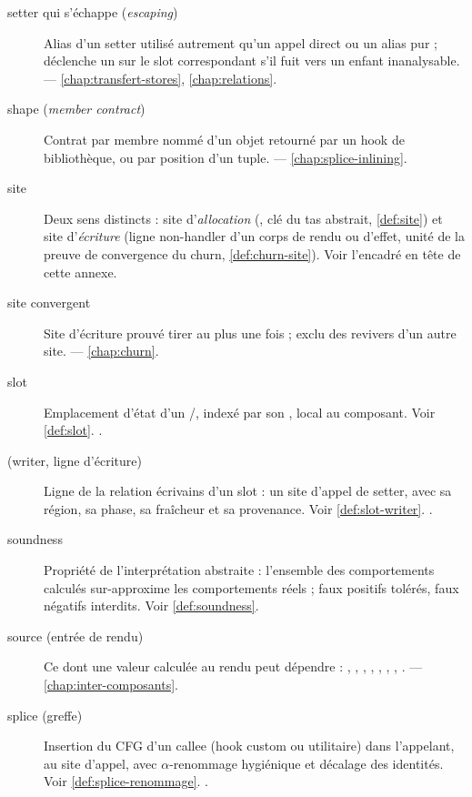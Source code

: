 \begin{description}
\item[setter qui s'échappe (\emph{escaping})] Alias d'un setter utilisé autrement qu'un appel direct ou un alias pur ; déclenche un  sur le slot correspondant s'il fuit vers un enfant inanalysable.  — \cref{chap:transfert-stores}, \cref{chap:relations}.

\item[shape (\emph{member contract})] Contrat par membre nommé d'un objet retourné par un hook de bibliothèque, ou par position d'un tuple.  — \cref{chap:splice-inlining}.

\item[site] Deux sens distincts : site d'\emph{allocation} (, clé du tas abstrait, \cref{def:site}) et site d'\emph{écriture} (ligne non-handler d'un corps de rendu ou d'effet, unité de la preuve de convergence du churn, \cref{def:churn-site}). Voir l'encadré en tête de cette annexe.

\item[site convergent] Site d'écriture prouvé tirer au plus une fois ; exclu des revivers d'un autre site.  — \cref{chap:churn}.

\item[slot] Emplacement d'état d'un /, indexé par son , local au composant. Voir \cref{def:slot}. .

\item[ (writer, ligne d'écriture)] Ligne de la relation \og écrivains d'un slot\fg{} : un site d'appel de setter, avec sa région, sa phase, sa fraîcheur et sa provenance. Voir \cref{def:slot-writer}. .

\item[soundness] Propriété de l'interprétation abstraite : l'ensemble des comportements calculés sur-approxime les comportements réels ; faux positifs tolérés, faux négatifs interdits. Voir \cref{def:soundness}.

\item[source (entrée de rendu)] Ce dont une valeur calculée au rendu peut dépendre : , , , , , , , .  — \cref{chap:inter-composants}.

\item[splice (greffe)] Insertion du CFG d'un callee (hook custom ou utilitaire) dans l'appelant, au site d'appel, avec \(\alpha\)-renommage hygiénique et décalage des identités. Voir \cref{def:splice-renommage}. .


\end{description}

